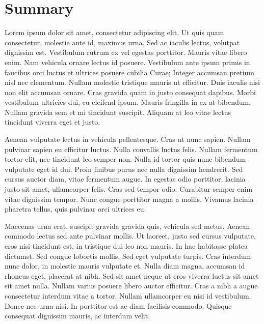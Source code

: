 \documentclass{paper}
\begin{document}
\maketitle

\section{Summary}
Lorem ipsum dolor sit amet, consectetur adipiscing elit. Ut quis quam consectetur, molestie ante id, maximus urna. Sed ac iaculis lectus, volutpat dignissim est. Vestibulum rutrum ex vel egestas porttitor. Mauris vitae libero enim. Nam vehicula ornare lectus id posuere. Vestibulum ante ipsum primis in faucibus orci luctus et ultrices posuere cubilia Curae; Integer accumsan pretium nisl nec elementum. Nullam molestie tristique mauris ut efficitur. Duis iaculis nisi non elit accumsan ornare. Cras gravida quam in justo consequat dapibus. Morbi vestibulum ultricies dui, eu eleifend ipsum. Mauris fringilla in ex at bibendum. Nullam gravida sem et mi tincidunt suscipit. Aliquam at leo vitae lectus tincidunt viverra eget et justo.

Aenean vulputate lectus in vehicula pellentesque. Cras ut nunc sapien. Nullam pulvinar sapien eu efficitur luctus. Nulla convallis luctus felis. Nullam fermentum tortor elit, nec tincidunt leo semper non. Nulla id tortor quis nunc bibendum vulputate eget id dui. Proin finibus purus nec nulla dignissim hendrerit. Sed cursus auctor diam, vitae fermentum augue. In egestas odio porttitor, lacinia justo sit amet, ullamcorper felis. Cras sed tempor odio. Curabitur semper enim vitae dignissim tempor. Nunc congue porttitor magna a mollis. Vivamus lacinia pharetra tellus, quis pulvinar orci ultrices eu.

Maecenas urna erat, suscipit gravida gravida quis, vehicula sed metus. Aenean commodo lectus sed ante pulvinar mollis. Ut laoreet, justo sed cursus vulputate, eros nisi tincidunt est, in tristique dui leo non mauris. In hac habitasse platea dictumst. Sed congue lobortis mollis. Sed eget vulputate turpis. Cras interdum nunc dolor, in molestie mauris vulputate et. Nulla diam magna, accumsan id rhoncus eget, placerat at nibh. Sed sit amet neque ut eros viverra luctus sit amet sit amet nulla. Nullam varius posuere libero auctor efficitur. Cras a nibh a augue consectetur interdum vitae a tortor. Nullam ullamcorper eu nisi id vestibulum. Donec nec urna nisi. In porttitor est ac diam facilisis commodo. Quisque consequat dignissim mauris, ac interdum velit.
\end{document}
